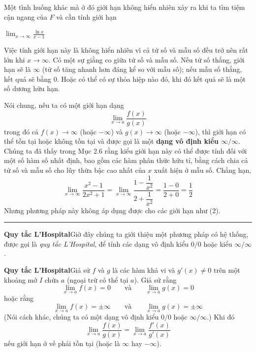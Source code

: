 \begin{minipage}[t]{380pt}
  \setlength{\parindent}{0pt}
  \setlength{\parskip}{5pt}
  Một tình huống khác mà ở đó giới hạn không hiển nhiên xảy ra khi ta tìm tiệm cận ngang của $F$ và cần tính giới hạn

  \vspace{2pt}
  \noindent
  \makebox[0pt][l]{%
    \tikz[baseline=-2.5pt]\node[draw=stewartred, line width=0.8pt, inner sep=2pt, rounded corners=0.5pt] {\textcolor{stewartred}{\bfseries\small 2}};%
  }%
  \hfill
  $\displaystyle \lim_{x \to \infty} \frac{\ln x}{x - 1}$
  \hfill\null
  \vspace{2pt}

  Việc tính giới hạn này là không hiển nhiên vì cả tử số và mẫu số đều trở nên rất lớn khi $x \to \infty$. Có một sự giằng co giữa tử số và mẫu số. Nếu tử số thắng, giới hạn sẽ là $\infty$ (tử số tăng nhanh hơn đáng kể so với mẫu số); nếu mẫu số thắng, kết quả sẽ bằng $0$. Hoặc có thể có sự thỏa hiệp nào đó, khi đó kết quả sẽ là một số dương hữu hạn.

  Nói chung, nếu ta có một giới hạn dạng
  \[
  \lim_{x \to a} \frac{f(x)}{g(x)}
  \]
  trong đó cả $f(x) \to \infty$ (hoặc $-\infty$) và $g(x) \to \infty$ (hoặc $-\infty$), thì giới hạn có thể tồn tại hoặc không tồn tại và được gọi là một \textbf{dạng vô định kiểu $\boldsymbol{\infty/\infty}$}. Chúng ta đã thấy trong Mục 2.6 rằng kiểu giới hạn này có thể được tính đối với một số hàm số nhất định, bao gồm các hàm phân thức hữu tỉ, bằng cách chia cả tử số và mẫu số cho lũy thừa bậc cao nhất của $x$ xuất hiện ở mẫu số. Chẳng hạn,
  \[
  \lim_{x \to \infty} \frac{x^2 - 1}{2x^2 + 1} = \lim_{x \to \infty} \frac{1 - \dfrac{1}{x^2}}{2 + \dfrac{1}{x^2}} = \frac{1 - 0}{2 + 0} = \frac{1}{2}
  \]
  Nhưng phương pháp này không áp dụng được cho các giới hạn như (2).

  \vspace{2pt}
  \noindent
  {\color{stewartteal}\rule{1.1ex}{1.1ex}}\enspace\textbf{\textsf{Quy tắc L'Hospital}}\quad Giờ đây chúng ta giới thiệu một phương pháp có hệ thống, được gọi là \textit{quy tắc L'Hospital}, để tính các dạng vô định kiểu $0/0$ hoặc kiểu $\infty/\infty$.

  \vspace{3pt}
  \begin{tcolorbox}[
    enhanced,
    colback=white,
    colframe=stewartred,
    boxrule=1pt,
    arc=0mm,
    top=7pt,
    bottom=7pt,
    left=9pt,
    right=9pt
  ]
    \noindent\textbf{\textcolor{stewartred}{Quy tắc L'Hospital}}\enspace Giả sử $f$ và $g$ là các hàm khả vi và $g'(x) \neq 0$ trên một khoảng mở $I$ chứa $a$ (ngoại trừ có thể tại $a$). Giả sử rằng
    \[
    \lim_{x \to a} f(x) = 0 \qquad \text{và} \qquad \lim_{x \to a} g(x) = 0
    \]
    hoặc rằng
    \[
    \lim_{x \to a} f(x) = \pm\infty \qquad \text{và} \qquad \lim_{x \to a} g(x) = \pm\infty
    \]
    (Nói cách khác, chúng ta có một dạng vô định kiểu $0/0$ hoặc $\infty/\infty$.) Khi đó
    \[
    \lim_{x \to a} \frac{f(x)}{g(x)} = \lim_{x \to a} \frac{f'(x)}{g'(x)}
    \]
    nếu giới hạn ở vế phải tồn tại (hoặc là $\infty$ hay $-\infty$).
  \end{tcolorbox}


\end{minipage}
